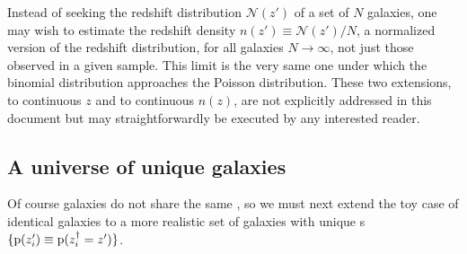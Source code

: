 Instead of seeking the redshift distribution $\mathcal{N}(z')$ of a set of $N$ galaxies, one may wish to estimate the redshift density ${n(z') \equiv \mathcal{N}(z') / N}$, a normalized version of the redshift distribution, for all galaxies ${N \to \infty}$, not just those observed in a given sample.
This limit is the very same one under which the binomial distribution approaches the Poisson distribution.
These two extensions, to continuous $z$ and to continuous $n(z)$, are not explicitly addressed in this document but may straightforwardly be executed by any interested reader.

\subsection{A universe of unique galaxies}

Of course galaxies do not share the same \pzpdf, so we must next extend the toy case of identical galaxies to a more realistic set of galaxies with unique \pzpdf s ${\{\mathrm{p}(z'_{i}) \equiv \mathrm{p}(z_{i}^{\dagger} = z')\}}$.

